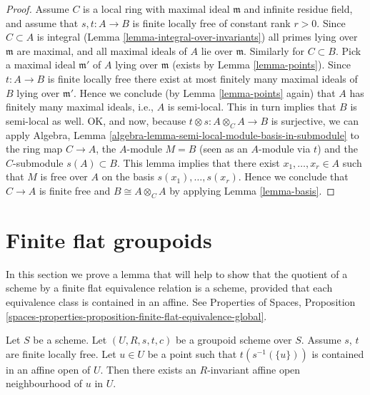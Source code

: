 \begin{proof}
\medskip\noindent
Assume $C$ is a local ring with maximal ideal $\mathfrak m$ and
infinite residue field, and assume that $s, t : A \to B$ is
finite locally free of constant rank $r > 0$.
Since $C \subset A$ is integral (Lemma \ref{lemma-integral-over-invariants})
all primes lying over $\mathfrak m$ are maximal, and all maximal
ideals of $A$ lie over $\mathfrak m$. Similarly for $C \subset B$.
Pick a maximal ideal $\mathfrak m'$
of $A$ lying over $\mathfrak m$ (exists by Lemma \ref{lemma-points}).
Since $t : A \to B$ is finite locally free there exist at most finitely
many maximal ideals of $B$ lying over $\mathfrak m'$. Hence we conclude
(by Lemma \ref{lemma-points} again)
that $A$ has finitely many maximal ideals, i.e.,
$A$ is semi-local. This in turn implies that $B$ is semi-local as
well. OK, and now, because $t \otimes s : A \otimes_C A \to B$ is surjective,
we can apply
Algebra, Lemma \ref{algebra-lemma-semi-local-module-basis-in-submodule}
to the ring map $C \to A$, the $A$-module $M = B$ (seen as an $A$-module
via $t$) and the $C$-submodule $s(A) \subset B$. This lemma implies that there
exist $x_1, \ldots, x_r \in A$ such that $M$ is free over $A$
on the basis $s(x_1), \ldots, s(x_r)$. Hence we conclude that $C \to A$
is finite free and $B \cong A \otimes_C A$ by applying
Lemma \ref{lemma-basis}.
\end{proof}



\section{Finite flat groupoids}
\label{section-finite-flat-general}

\noindent
In this section we prove a lemma that will help to show that the quotient
of a scheme by a finite flat equivalence relation is a scheme, provided that
each equivalence class is contained in an affine. See
Properties of Spaces,
Proposition \ref{spaces-properties-proposition-finite-flat-equivalence-global}.

\begin{lemma}
\label{lemma-find-invariant-affine}
Let $S$ be a scheme.
Let $(U, R, s, t, c)$ be a groupoid scheme over $S$.
Assume $s$, $t$ are finite locally free.
Let $u \in U$ be a point such that $t(s^{-1}(\{u\}))$
is contained in an affine open of $U$.
Then there exists an $R$-invariant affine open neighbourhood
of $u$ in $U$.
\end{lemma}

